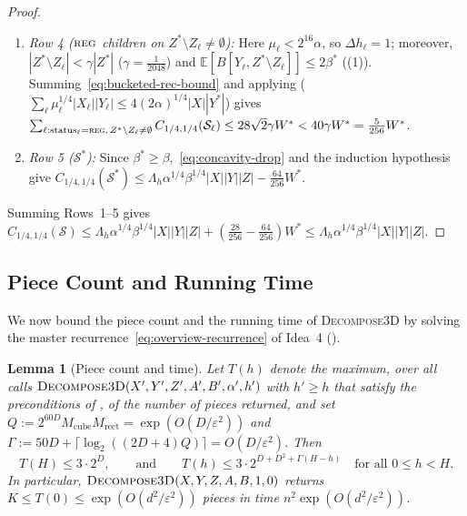 \documentclass[11pt]{article}
\newtheorem{lemma}[theorem]{Lemma}
\theoremstyle{definition}
\renewcommand{\label}[1]{}%
\newcommand{\E}{\mathbb{E}}
\newcommand{\abs}[1]{\left\lvert #1 \right\rvert}
\newcommand{\dens}[1]{\E[#1]}
\newcommand{\pot}{C_{1/4,1/4}}
\newcommand{\DecomposeThreeD}{\textnormal{\textsc{Decompose3D}}}
\newcommand{\tagreg}{\textnormal{\textsc{reg}}}
\newcommand{\tagdenseA}{\textnormal{\textsc{denseA}}}
\begin{document}
\begin{proof}
\begin{enumerate}[label=\arabic*.]
    \begin{align*}
        \sum_{\ell : \text{status}_\ell = \tagdenseA} \pot(\mathcal{S}_\ell) &\le \frac{7}{2}\Lambda_h (2\beta^*)^{1/4}\abs{Z^*} \cdot 2^{-11}\alpha^{-3/4}(2\alpha\abs{X}\abs{Y^*}) \\
        &= 7 \cdot 2^{1/4} \cdot 2^{-11} W^* < \frac{2}{256} W^*.
    \end{align*}
    \item \emph{Row 4 ($\tagreg$ children on $Z^* \setminus Z_\ell \ne \emptyset$):} Here $\mu_\ell < 2^{16}\alpha$, so $\Delta h_\ell = 1$; moreover, $\abs{Z^* \setminus Z_\ell} < \gamma\abs{Z^*}$ ($\gamma = \frac{1}{2048}$) and $\dens{B[Y_\ell, Z^* \setminus Z_\ell]} \le 2\beta^*$ ((1)). Summing~\eqref{eq:bucketed-rec-bound} and applying  ($\sum_\ell \mu_\ell^{1/4}\abs{X_\ell}\abs{Y_\ell} \le 4(2\alpha)^{1/4}\abs{X}\abs{Y^*}$) gives $\sum_{\ell : \text{status}_\ell = \tagreg,\, Z^* \setminus Z_\ell \ne \emptyset} \pot(\mathcal{S}_\ell) \le 28\sqrt{2}\gamma W^* < 40\gamma W^* = \frac{5}{256} W^*$.
    \item \emph{Row 5 ($\mathcal{S}^*$):} Since $\beta^* \ge \beta$,~\eqref{eq:concavity-drop} and the induction hypothesis give $\pot(\mathcal{S}^*) \le \Lambda_h \alpha^{1/4}\beta^{1/4}\abs{X}\abs{Y}\abs{Z} - \frac{64}{256} W^*$.
\end{enumerate}
Summing Rows~1--5 gives $\pot(\mathcal{S}) \le \Lambda_h \alpha^{1/4}\beta^{1/4}\abs{X}\abs{Y}\abs{Z} + (\frac{28}{256} - \frac{64}{256})W^* \le \Lambda_h \alpha^{1/4}\beta^{1/4}\abs{X}\abs{Y}\abs{Z}$.
\end{proof}

\subsection{Piece Count and Running Time}
\label{sec:3d-recurrence}

We now bound the piece count and the running time of \DecomposeThreeD{} by solving the master recurrence~\eqref{eq:overview-recurrence} of Idea~4 ().

\begin{lemma}[Piece count and time]
\label{lem:recurrence}
Let $T(h)$ denote the maximum, over all calls $\DecomposeThreeD(X', Y', Z', A', B', \alpha', h')$ with $h' \ge h$ that satisfy the preconditions of , of the number of pieces returned, and set $Q := 2^{60D} M_{\text{cube}} M_{\text{rect}} = \exp(O(D/\varepsilon^2))$ and $\Gamma := 50D + \lceil \log_2((2D+4)Q) \rceil = O(D/\varepsilon^2)$. Then
\begin{equation}\label{eq:th-inductive}
    T(H) \le 3 \cdot 2^D, \qquad \text{and} \qquad T(h) \le 3 \cdot 2^{D + D^2 + \Gamma(H - h)} \quad \text{for all } 0 \le h < H.
\end{equation}
In particular, $\DecomposeThreeD(X, Y, Z, A, B, 1, 0)$ returns $K \le T(0) \le \exp(O(d^2 / \varepsilon^2))$ pieces in time $n^2 \exp(O(d^2 / \varepsilon^2))$.
\end{lemma}
\end{document}
